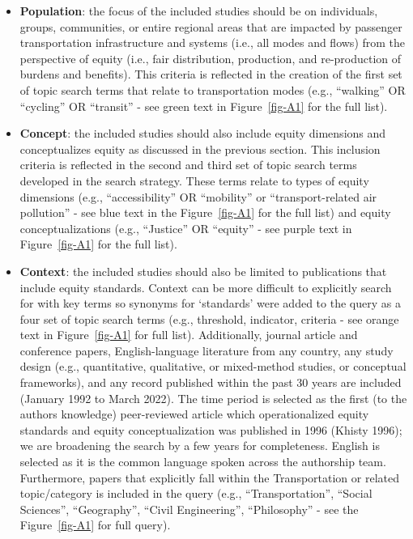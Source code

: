 \documentclass[12pt, oneside]{report}
\providecommand{\tightlist}{%
  \setlength{\itemsep}{0pt}\setlength{\parskip}{0pt}}\usepackage{longtable,booktabs,array}
\begin{document}
\begin{itemize}
\tightlist
\item
  \textbf{Population}: the focus of the included studies should be on
  individuals, groups, communities, or entire regional areas that are
  impacted by passenger transportation infrastructure and systems (i.e.,
  all modes and flows) from the perspective of equity (i.e., fair
  distribution, production, and re-production of burdens and benefits).
  This criteria is reflected in the creation of the first set of topic
  search terms that relate to transportation modes (e.g., ``walking'' OR
  ``cycling'' OR ``transit'' - see green text in Figure~\ref{fig-A1} for
  the full list).
\item
  \textbf{Concept}: the included studies should also include equity
  dimensions and conceptualizes equity as discussed in the previous
  section. This inclusion criteria is reflected in the second and third
  set of topic search terms developed in the search strategy. These
  terms relate to types of equity dimensions (e.g., ``accessibility'' OR
  ``mobility'' or ``transport-related air pollution'' - see blue text in
  the Figure~\ref{fig-A1} for the full list) and equity
  conceptualizations (e.g., ``Justice'' OR ``equity'' - see purple text
  in Figure~\ref{fig-A1} for the full list).
\item
  \textbf{Context}: the included studies should also be limited to
  publications that include equity standards. Context can be more
  difficult to explicitly search for with key terms so synonyms for
  `standards' were added to the query as a four set of topic search
  terms (e.g., threshold, indicator, criteria - see orange text in
  Figure~\ref{fig-A1} for full list). Additionally, journal article and
  conference papers, English-language literature from any country, any
  study design (e.g., quantitative, qualitative, or mixed-method
  studies, or conceptual frameworks), and any record published within
  the past 30 years are included (January 1992 to March 2022). The time
  period is selected as the first (to the authors knowledge)
  peer-reviewed article which operationalized equity standards and
  equity conceptualization was published in 1996 (Khisty 1996); we are
  broadening the search by a few years for completeness. English is
  selected as it is the common language spoken across the authorship
  team. Furthermore, papers that explicitly fall within the
  Transportation or related topic/category is included in the query
  (e.g., ``Transportation'', ``Social Sciences'', ``Geography'', ``Civil
  Engineering'', ``Philosophy'' - see the Figure~\ref{fig-A1} for full
  query).
\end{itemize}
\end{document}
